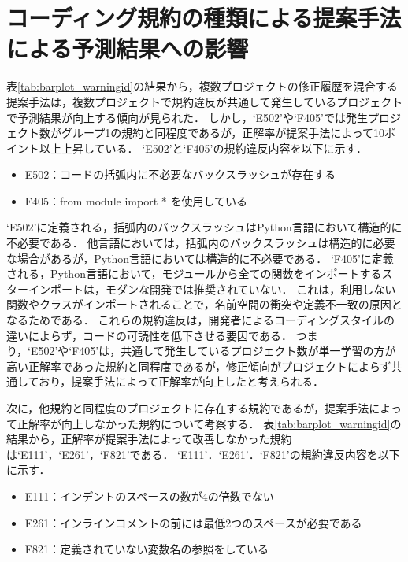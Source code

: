 \documentclass[11pt]{jreport}
\begin{document}
\section{コーディング規約の種類による提案手法による予測結果への影響}

表\ref{tab:barplot_warningid}の結果から，複数プロジェクトの修正履歴を混合する提案手法は，複数プロジェクトで規約違反が共通して発生しているプロジェクトで予測結果が向上する傾向が見られた．
しかし，`E502'や`F405'では発生プロジェクト数がグループ1の規約と同程度であるが，正解率が提案手法によって10ポイント以上上昇している．
`E502'と`F405'の規約違反内容を以下に示す．

\begin{itemize}
    \item E502：コードの括弧内に不必要なバックスラッシュが存在する
    \item F405：from module import * を使用している
\end{itemize}

`E502'に定義される，括弧内のバックスラッシュはPython言語において構造的に不必要である．
他言語においては，括弧内のバックスラッシュは構造的に必要な場合があるが，Python言語においては構造的に不必要である．
`F405'に定義される，Python言語において，モジュールから全ての関数をインポートするスターインポートは，モダンな開発では推奨されていない．
これは，利用しない関数やクラスがインポートされることで，名前空間の衝突や定義不一致の原因となるためである．
これらの規約違反は，開発者によるコーディングスタイルの違いによらず，コードの可読性を低下させる要因である．
つまり，`E502'や`F405'は，共通して発生しているプロジェクト数が単一学習の方が高い正解率であった規約と同程度であるが，修正傾向がプロジェクトによらず共通しており，提案手法によって正解率が向上したと考えられる．

次に，他規約と同程度のプロジェクトに存在する規約であるが，提案手法によって正解率が向上しなかった規約について考察する．  
表\ref{tab:barplot_warningid}の結果から，正解率が提案手法によって改善しなかった規約は`E111'，`E261'，`F821'である．
`E111'．`E261'．`F821'の規約違反内容を以下に示す．

\begin{itemize}
    \item E111：インデントのスペースの数が4の倍数でない
    \item E261：インラインコメントの前には最低2つのスペースが必要である
    \item F821：定義されていない変数名の参照をしている
\end{itemize}
\end{document}
